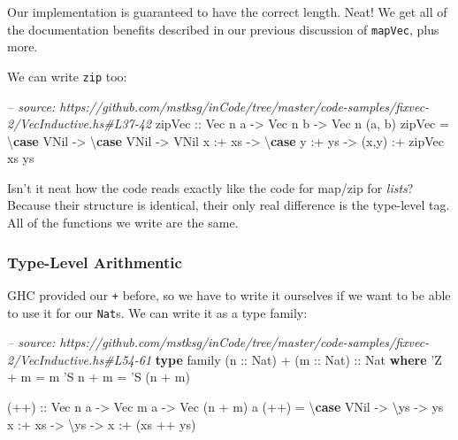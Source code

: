 \documentclass[]{article}
\newenvironment{Shaded}{}{}
\newcommand{\KeywordTok}[1]{\textcolor[rgb]{0.00,0.44,0.13}{\textbf{#1}}}
\newcommand{\DataTypeTok}[1]{\textcolor[rgb]{0.56,0.13,0.00}{#1}}
\newcommand{\CharTok}[1]{\textcolor[rgb]{0.25,0.44,0.63}{#1}}
\newcommand{\CommentTok}[1]{\textcolor[rgb]{0.38,0.63,0.69}{\textit{#1}}}
\newcommand{\OtherTok}[1]{\textcolor[rgb]{0.00,0.44,0.13}{#1}}
\newcommand{\FunctionTok}[1]{\textcolor[rgb]{0.02,0.16,0.49}{#1}}
\newcommand{\NormalTok}[1]{#1}
\begin{document}
Our implementation is guaranteed to have the correct length. Neat! We get all of
the documentation benefits described in our previous discussion of
\texttt{mapVec}, plus more.

We can write \texttt{zip} too:

\begin{Shaded}
\begin{Highlighting}[]
\CommentTok{-- source: https://github.com/mstksg/inCode/tree/master/code-samples/fixvec-2/VecInductive.hs#L37-42}
\OtherTok{zipVec ::} \DataTypeTok{Vec}\NormalTok{ n a }\OtherTok{->} \DataTypeTok{Vec}\NormalTok{ n b }\OtherTok{->} \DataTypeTok{Vec}\NormalTok{ n (a, b)}
\NormalTok{zipVec }\FunctionTok{=}\NormalTok{ \textbackslash{}}\KeywordTok{case}
    \DataTypeTok{VNil} \OtherTok{->}\NormalTok{ \textbackslash{}}\KeywordTok{case}
      \DataTypeTok{VNil} \OtherTok{->} \DataTypeTok{VNil}
\NormalTok{    x }\FunctionTok{:+}\NormalTok{ xs }\OtherTok{->}\NormalTok{ \textbackslash{}}\KeywordTok{case}
\NormalTok{      y }\FunctionTok{:+}\NormalTok{ ys }\OtherTok{->}\NormalTok{ (x,y) }\FunctionTok{:+}\NormalTok{ zipVec xs ys}
\end{Highlighting}
\end{Shaded}

Isn't it neat how the code reads exactly like the code for map/zip for
\emph{lists}? Because their structure is identical, their only real difference
is the type-level tag. All of the functions we write are the same.

\subsubsection{Type-Level Arithmentic}\label{type-level-arithmentic}

GHC provided our \texttt{+} before, so we have to write it ourselves if we want
to be able to use it for our \texttt{Nat}s. We can write it as a type family:

\begin{Shaded}
\begin{Highlighting}[]
\CommentTok{-- source: https://github.com/mstksg/inCode/tree/master/code-samples/fixvec-2/VecInductive.hs#L54-61}
\KeywordTok{type}\NormalTok{ family (}\OtherTok{n ::} \DataTypeTok{Nat}\NormalTok{) }\FunctionTok{+}\NormalTok{ (}\OtherTok{m ::} \DataTypeTok{Nat}\NormalTok{)}\OtherTok{ ::} \DataTypeTok{Nat} \KeywordTok{where}
    \CharTok{'Z   + m = m}
    \CharTok{'S n + m = '}\DataTypeTok{S}\NormalTok{ (n }\FunctionTok{+}\NormalTok{ m)}

\OtherTok{(++) ::} \DataTypeTok{Vec}\NormalTok{ n a }\OtherTok{->} \DataTypeTok{Vec}\NormalTok{ m a }\OtherTok{->} \DataTypeTok{Vec}\NormalTok{ (n }\FunctionTok{+}\NormalTok{ m) a}
\NormalTok{(}\FunctionTok{++}\NormalTok{) }\FunctionTok{=}\NormalTok{ \textbackslash{}}\KeywordTok{case}
    \DataTypeTok{VNil}    \OtherTok{->}\NormalTok{ \textbackslash{}ys }\OtherTok{->}\NormalTok{ ys}
\NormalTok{    x }\FunctionTok{:+}\NormalTok{ xs }\OtherTok{->}\NormalTok{ \textbackslash{}ys }\OtherTok{->}\NormalTok{ x }\FunctionTok{:+}\NormalTok{ (xs }\FunctionTok{++}\NormalTok{ ys)}
\end{Highlighting}
\end{Shaded}
\end{document}
